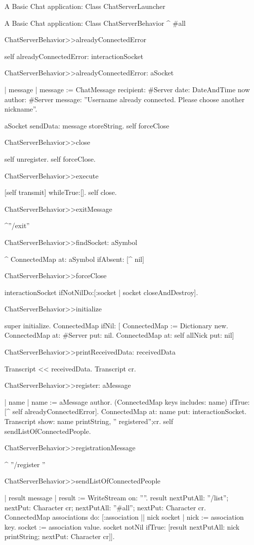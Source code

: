 \documentclass[a4paper,10pt,twoside]{book}
\begin{document}
\begin{script}{A Basic Chat application: Class ChatServerLauncher}
\begin{classdef}{A Basic Chat application: Class ChatServerBehavior}
	^ #all

ChatServerBehavior>>alreadyConnectedError

	self alreadyConnectedError: interactionSocket

ChatServerBehavior>>alreadyConnectedError: aSocket

	| message |
	message := ChatMessage
					recipient: #Server
					date: DateAndTime now
					author: #Server
					message: ''Username already connected. Please choose another nickname''.
						
	aSocket sendData: message storeString.
	self forceClose

ChatServerBehavior>>close
	
	self unregister.
	self forceClose.

ChatServerBehavior>>execute

	[self transmit] whileTrue:[].
	self close.

ChatServerBehavior>>exitMessage

	^''/exit''

ChatServerBehavior>>findSocket: aSymbol

	^ ConnectedMap at: aSymbol ifAbsent: [^ nil]

ChatServerBehavior>>forceClose
	
	interactionSocket ifNotNilDo:[:socket | socket closeAndDestroy].

ChatServerBehavior>>initialize

	super initialize.
	ConnectedMap 
		ifNil: [
			ConnectedMap := Dictionary new.
			ConnectedMap at: #Server put: nil.
			ConnectedMap at: self allNick put: nil]

ChatServerBehavior>>printReceivedData: receivedData
	
	Transcript << receivedData.
	Transcript cr.

ChatServerBehavior>>register: aMessage

	| name |
	name := aMessage author.
	(ConnectedMap keys includes: name)
		ifTrue: [^ self alreadyConnectedError].
	ConnectedMap at: name put: interactionSocket.
	Transcript show: name printString, '' registered'';cr.
	self sendListOfConnectedPeople.

ChatServerBehavior>>registrationMessage

	^ ''/register ''

ChatServerBehavior>>sendListOfConnectedPeople

	| result message |
	result := WriteStream on: ''''.
	result 
		nextPutAll: ''/list'';
		nextPut: Character cr;
		nextPutAll: ''#all'';
		nextPut: Character cr.
	ConnectedMap associations do: [:association || nick socket |
		nick := association key.
		socket := association value.
		socket notNil
			ifTrue: [result 
						nextPutAll: nick printString;
						nextPut: Character cr]].
	

\end{classdef}
\end{script}
\end{document}
